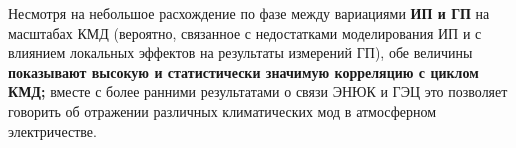Несмотря на небольшое расхождение по фазе между вариациями \textbf{ИП и ГП} на масштабах КМД (вероятно, связанное с недостатками моделирования ИП и с влиянием локальных эффектов на результаты измерений ГП), обе величины \textbf{показывают высокую и статистически значимую корреляцию с циклом КМД;} вместе с более ранними результатами о связи ЭНЮК и ГЭЦ \cite{Slyunyaev_et_al_2021a, Slyunyaev_et_al_2021b, Harrison_et_al_2011, Slyunyaev_et_al_2021c, Lavigne_et_al_2017} это позволяет говорить об отражении различных климатических мод в атмосферном электричестве.

